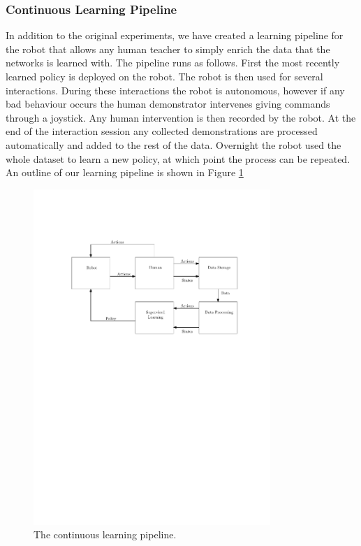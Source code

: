 \documentclass[a4paper,11pt]{report}
\begin{document}
\subsubsection{Continuous Learning Pipeline}
	In addition to the original experiments, we have created a learning pipeline for the robot that allows any human teacher to simply enrich the data that the networks is learned with. The pipeline runs as follows. First the most recently learned policy is deployed on the robot. The robot is then used for several interactions. During these interactions the robot is autonomous, however if any bad behaviour occurs the human demonstrator intervenes giving commands through a joystick. Any human intervention is then recorded by the robot. At the end of the interaction session any collected demonstrations are processed automatically and added to the rest of the data. Overnight the robot used the whole dataset to learn a new policy, at which point the process can be repeated. An outline of our learning pipeline is shown in Figure \ref{fig:pipeline}
	
	
	\begin{figure}
	\centering
	    \includegraphics[width=0.8\textwidth]{figures/pipeline.pdf}
	  \caption[Pipeline]{The continuous learning pipeline.}
	  \label{fig:pipeline}
	\end{figure}
\end{document}
